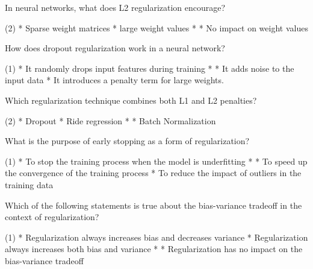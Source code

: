 \documentclass[11pt]{extarticle}
\begin{document}
\begin{exercise}
    In neural networks, what does L2 regularization encourage?
    \begin{choice} (2)
        * Sparse weight matrices
        * large weight values
        * 
        * No impact on weight values
    \end{choice}
\end{exercise}
\begin{solution}
\end{solution}

\begin{exercise}
    How does dropout regularization work in a neural network?
    \begin{choice}(1)
        * It randomly drops input features during training
        * 
        * It adds noise to the input data
        * It introduces a penalty term for large weights.
    \end{choice}
\end{exercise}
\begin{solution}
\end{solution}

\begin{exercise}
    Which regularization technique combines both L1 and L2 penalties?
    \begin{choice} (2)
        * Dropout
        * Ride regression
        * 
        * Batch Normalization
    \end{choice}
\end{exercise}
\begin{solution}
\end{solution}

\begin{exercise}
    What is the purpose of early stopping as a form of regularization?
    \begin{choice} (1)
        * To stop the training process when the model is underfitting
        * 
        * To speed up the convergence of the training process
        * To reduce the impact of outliers in the training data
    \end{choice}
\end{exercise}
\begin{solution}
\end{solution}

\begin{exercise}
    Which of the following statements is true about the bias-variance tradeoff in the context of regularization?
    \begin{choice} (1)
        * Regularization always increases bias and decreases variance
        * Regularization always increases both bias and variance
        * 
        * Regularization has no impact on the bias-variance tradeoff
    \end{choice}
\end{exercise}
\begin{solution}
\end{solution}
\end{document}
